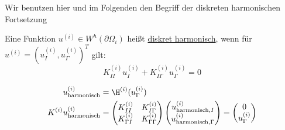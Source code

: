 Wir benutzen hier und im Folgenden den Begriff der diskreten harmonischen Fortsetzung

\begin{definition}
  Eine Funktion $u^{(i)}\in W^h(\partial\Omega_i)$ heißt \underline{diskret harmonisch}, wenn für $u^{(i)}=(u_I^{(i)},u_\Gamma^{(i)})^T$ gilt:
  \[
    K_{II}^{(i)}u_I^{(i)}+K_{I\Gamma}^{(i)}u_\Gamma^{(i)} = 0 
  \]

  \begin{align*}
    u^{(i)}_{\text{harmonisch}} &= \H^{(i)}(u_{\Gamma}^{(i)})\\
    K^{(i)}u_{\text{harmonisch}}^{(i)} &= 
    \begin{pmatrix}
      K_{II}^{(i)} & K_{I\Gamma}^{(i)}\\
      K_{\Gamma I}^{(i)} & K_{\Gamma\Gamma}^{(i)}
    \end{pmatrix}
    \begin{pmatrix}
      u_{\text{harmonisch},I}^{(i)}\\
      u_{\text{harmonisch},\Gamma}^{(i)}
    \end{pmatrix}
    =
    \begin{pmatrix}
      0\\
      u_{\Gamma}^{(i)}
    \end{pmatrix}
  \end{align*}
\end{definition}
